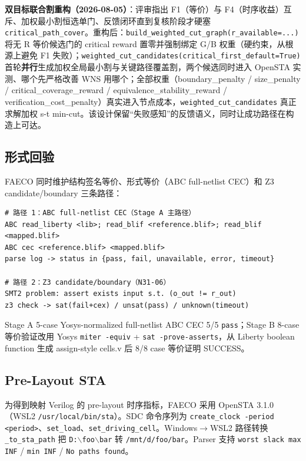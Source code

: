 \documentclass[journal]{IEEEtran}
\begin{document}
\textbf{双目标联合割重构（2026-08-05）}：评审指出 F1（等价）与 F4（时序收益）互斥、加权最小割恒选单门、反馈闭环直到复核阶段才硬塞 \texttt{critical\_path\_cover}。重构后：\texttt{build\_weighted\_cut\_graph(r\_available=...)} 将无 R 等价候选门的 critical reward 置零并强制绑定 G/B 权重（硬约束，从根源上避免 F1 失败）；\texttt{weighted\_cut\_candidates(critical\_first\_default=True)} 首轮\textbf{并行}生成加权全局最小割与关键路径覆盖割，两个候选同时进入 OpenSTA 实测、哪个先严格改善 WNS 用哪个；全部权重（boundary\_penalty / size\_penalty / critical\_coverage\_reward / equivalence\_stability\_reward / verification\_cost\_penalty）真实进入节点成本，\texttt{weighted\_cut\_candidates} 真正求解加权 s-t min-cut。该设计保留“失败感知”的反馈语义，同时让成功路径在构造上可达。

\subsection{形式回验}

FAECO 同时维护结构签名等价、形式等价（ABC full-netlist CEC）和 Z3 candidate/boundary 三条路径：
\begin{verbatim}
# 路径 1：ABC full-netlist CEC（Stage A 主路径）
ABC read_liberty <lib>; read_blif <reference.blif>; read_blif <mapped.blif>
ABC cec <reference.blif> <mapped.blif>
parse log -> status in {pass, fail, unavailable, error, timeout}

# 路径 2：Z3 candidate/boundary（N31-06）
SMT2 problem: assert exists input s.t. (o_out != r_out)
z3 check -> sat(fail+cex) / unsat(pass) / unknown(timeout)
\end{verbatim}

Stage A 5-case Yosys-normalized full-netlist ABC CEC 5/5 \texttt{pass}；Stage B 8-case 等价验证改用 Yosys \texttt{miter -equiv} + \texttt{sat -prove-asserts}，从 Liberty boolean function 生成 assign-style cells.v 后 8/8 case 等价证明 SUCCESS。

\subsection{Pre-Layout STA}

为得到映射 Verilog 的 pre-layout 时序指标，FAECO 采用 OpenSTA 3.1.0（WSL2 \texttt{/usr/local/bin/sta}）。SDC 命令序列为 \texttt{create\_clock -period <period>}、\texttt{set\_load}、\texttt{set\_driving\_cell}。Windows$\rightarrow$WSL2 路径转换 \texttt{\_to\_sta\_path} 把 \texttt{D:$\backslash$foo$\backslash$bar} 转 \texttt{/mnt/d/foo/bar}。Parser 支持 \texttt{worst slack max INF} / \texttt{min INF} / \texttt{No paths found}。
\end{document}
